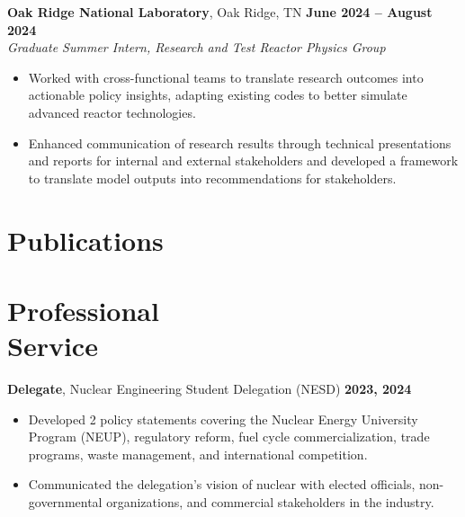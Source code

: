 \documentclass[margin,line]{resume}
\begin{document}
\begin{resume}
    \textbf{Oak Ridge National Laboratory}, Oak Ridge, TN \hfill \textbf{June 2024 -- August 2024} \\
    \textsl{Graduate Summer Intern, Research and Test Reactor Physics Group} \\
    \begin{itemize}
        \item Worked with cross-functional teams to translate research outcomes into actionable policy insights, adapting existing codes to better simulate advanced reactor technologies.
        \item Enhanced communication of research results through technical presentations and reports for internal and external stakeholders and developed a framework to translate model outputs into recommendations for stakeholders.
    \end{itemize}

    \vspace{-4mm}
    \section{\mysidestyle Publications}

    \begin{bibenum}
        \item {}
        \item {}
        \item {}
        \item {}
    \end{bibenum}

    \section{\mysidestyle Professional\\Service}
    \textbf{Delegate}, Nuclear Engineering Student Delegation (NESD) \hfill \textbf{2023, 2024}\vspace{.5mm}\\%
    \begin{itemize}
        \item Developed 2 policy statements covering the Nuclear Energy University Program (NEUP), regulatory reform, fuel cycle commercialization, trade programs, waste management, and international competition.
        \item Communicated the delegation's vision of nuclear with elected officials, non-governmental organizations, and commercial stakeholders in the industry.
    \end{itemize}


\end{resume}
\end{document}
